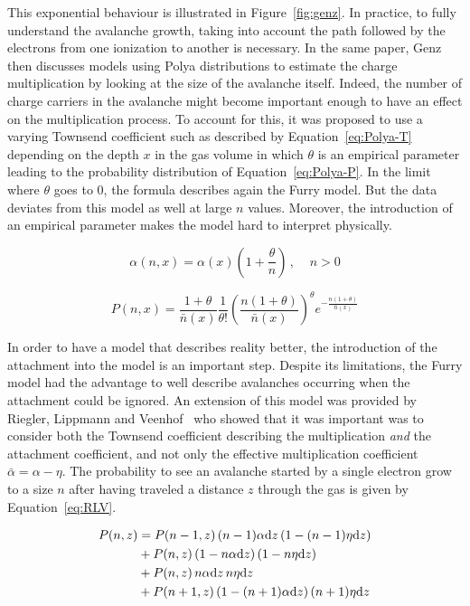 	This exponential behaviour is illustrated in Figure~\ref{fig:genz}. In practice, to fully understand the avalanche growth, taking into account the path followed by the electrons from one ionization to another is necessary. In the same paper, Genz then discusses models using Polya distributions to estimate the charge multiplication by looking at the size of the avalanche itself. Indeed, the number of charge carriers in the avalanche might become important enough to have an effect on the multiplication process. To account for this, it was proposed to use a varying Townsend coefficient such as described by Equation~\ref{eq:Polya-T} depending on the depth $x$ in the gas volume in which $\theta$ is an empirical parameter leading to the probability distribution of Equation~\ref{eq:Polya-P}. In the limit where $\theta$ goes to 0, the formula describes again the Furry model. But the data deviates from this model as well at large $n$ values. Moreover, the introduction of an empirical parameter makes the model hard to interpret physically.
	
	\begin{equation}
	\label{eq:Polya-T}
	\alpha(n,x) = \alpha(x) \left( 1 + \frac{\theta}{n} \right) \, , \;\;\;\; n > 0
	\end{equation}
	
	\begin{equation}
	\label{eq:Polya-P}
	P(n,x) = \frac{1+\theta}{\bar{n}(x)}\frac{1}{\theta !} \left( \frac{n(1+\theta)}{\bar{n}(x)} \right)^\theta e^{-\frac{n(1+\theta)}{\bar{n}(x)}}
	\end{equation}
	
	In order to have a model that describes reality better, the introduction of the attachment into the model is an important step. Despite its limitations, the Furry model had the advantage to well describe avalanches occurring when the attachment could be ignored. An extension of this model was provided by Riegler, Lippmann and Veenhof~\cite{RIEGLER2003} who showed that it was important was to consider both the Townsend coefficient describing the multiplication \textit{and} the attachment coefficient, and not only the effective multiplication coefficient $\bar{\alpha} = \alpha - \eta$. The probability to see an avalanche started by a single electron grow to a size $n$ after having traveled a distance $z$ through the gas is given by Equation~\ref{eq:RLV}.
	
\endgroup
	
	\begin{equation}
	\label{eq:RLV}
		\begin{aligned}
		P(n,z) &= P(n-1,z) \, (n-1)\alpha\mathrm{d}{z} \, (1-(n-1)\eta\mathrm{d}{z})\\
			   &+ P(n,z)   \, (1-n\alpha\mathrm{d}{z}) \, (1-n\eta\mathrm{d}{z})\\
			   &+ P(n,z)   \, n\alpha\mathrm{d}{z} \, n\eta\mathrm{d}{z}\\
			   &+ P(n+1,z) \, (1-(n+1)\alpha\mathrm{d}{z}) \, (n+1)\eta\mathrm{d}{z}
		\end{aligned}
	\end{equation}
	
